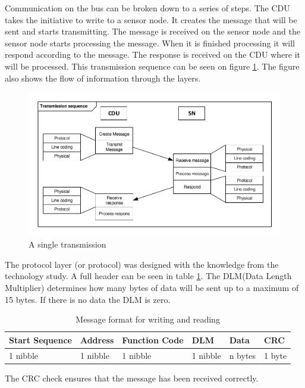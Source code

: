 Communication on the bus can be broken down to a series of steps. The CDU takes the initiative to write to a sensor node. It creates the message that will be sent and starts transmitting. The message is received on the sensor node and the sensor node starts processing the message. When it is finished processing it will respond according to the message. The response is received on the CDU where it will be processed. This transmission sequence can be seen on figure \ref{fig:sintrans}. The figure also shows the flow of information through the layers. 
\begin{figure}[hbpt]
\centering
\includegraphics[width=.8\textwidth]{billeder/11ProjectDescription/singletransmission}
\caption{A single transmission}
\label{fig:sintrans}
\end{figure}
The protocol layer (or protocol) was designed with the knowledge from the technology study. A full header can be seen in table \ref{table:stdmsgtosensor}. The DLM(Data Length Multiplier) determines how many bytes of data will be sent up to a maximum of 15 bytes. If there is no data the DLM is zero.
\begin{table}[hbpt]
\centering
\begin{tabular}{|l|l|l|l|l|l|}
	\hline
	Start Sequence & Address & Function Code & DLM & Data & CRC  \\ \hline
	1 nibble & 1 nibble	& 1 nibble & 1 nibble & n bytes & 1 byte\\
	\hline
\end{tabular}
\caption{Message format for writing and reading}
\label{table:stdmsgtosensor}
\end{table}
The CRC check ensures that the message has been received correctly.

